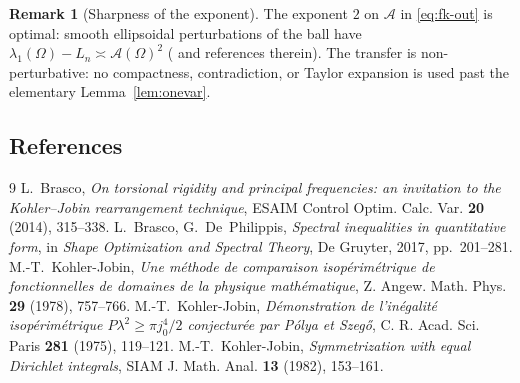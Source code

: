 \documentclass[11pt]{amsart}
\theoremstyle{definition}
\newtheorem{remark}[theorem]{Remark}
\newcommand{\Om}{\Omega}
\newcommand{\Fr}{\mathcal A}
\begin{document}
\begin{remark}[Sharpness of the exponent]\label{rem:sharp}
The exponent $2$ on $\Fr$ in \eqref{eq:fk-out} is optimal: smooth
ellipsoidal perturbations of the ball have
$\lambda_1(\Om)-L_n\asymp\Fr(\Om)^2$
(\cite{BraDeP2017,Brasco2014} and references therein). The transfer is
non-perturbative: no compactness, contradiction, or Taylor expansion is
used past the elementary Lemma~\ref{lem:onevar}.
\end{remark}

\subsection*{References}
\begin{thebibliography}{9}
 L.~Brasco,
\emph{On torsional rigidity and principal frequencies: an invitation to the
Kohler--Jobin rearrangement technique}, ESAIM Control Optim. Calc. Var.
\textbf{20} (2014), 315--338.
 L.~Brasco, G.~De~Philippis,
\emph{Spectral inequalities in quantitative form}, in
\emph{Shape Optimization and Spectral Theory}, De Gruyter, 2017,
pp.~201--281.
 M.-T.~Kohler-Jobin,
\emph{Une m\'ethode de comparaison isop\'erim\'etrique de fonctionnelles de
domaines de la physique math\'ematique}, Z. Angew. Math. Phys.
\textbf{29} (1978), 757--766.
 M.-T.~Kohler-Jobin,
\emph{D\'emonstration de l'in\'egalit\'e isop\'erim\'etrique
$P\lambda^2\ge\pi j_0^4/2$ conjectur\'ee par P\'olya et Szeg\H{o}},
C. R. Acad. Sci. Paris \textbf{281} (1975), 119--121.
 M.-T.~Kohler-Jobin,
\emph{Symmetrization with equal Dirichlet integrals}, SIAM J. Math. Anal.
\textbf{13} (1982), 153--161.
\end{thebibliography}

\end{document}
